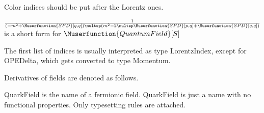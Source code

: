 Color indices should be put after the Lorentz ones.





\(\frac{1}{(-{m^2}+\Muserfunction{SPD}[q,q])\multsp ({m^2}-2\multsp \Muserfunction{SPD}[p,q]+\Muserfunction{SPD}[q,q])}\) is a short form for \(\Muserfunction{QuantumField}[S]\)




 The first list of indices is usually interpreted as type LorentzIndex, except for OPEDelta, which gets converted to type Momentum.

\dispSFinmath{
\overvar{\psi }{\_}
}


Derivatives of fields are denoted as follows.

\dispSFinmath{
\psi
}












QuarkField is the name of a fermionic field. QuarkField is just a name with no functional properties. Only typesetting rules are
  attached.

